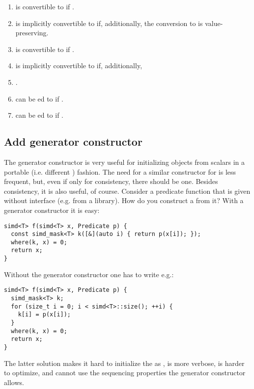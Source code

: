 \begin{enumerate}
  \item {} is convertible to  if
    .

  \item {} is implicitly convertible to 
    if, additionally, the conversion  to  is
    value-preserving.

  \item {} is convertible to  if
    .

  \item {} is implicitly convertible to
     if, additionally, \item {}.

  \item {} can be ed to  if
    .

  \item {} can be ed to  if
    .
\end{enumerate}

\subsection{Add  generator constructor}
The  generator constructor is very useful for initializing objects
from scalars in a portable (i.e. different ) fashion.
The need for a similar constructor for  is less frequent, but,
even if only for consistency, there should be one.
Besides consistency, it is also useful, of course.
Consider a predicate function that is given without  interface (e.g. from a library).
How do you construct a  from it?
With a generator constructor it is easy:
\medskip\begin{lstlisting}[style=Vc]
simd<T> f(simd<T> x, Predicate p) {
  const simd_mask<T> k([&](auto i) { return p(x[i]); });
  where(k, x) = 0;
  return x;
}
\end{lstlisting}
Without the generator constructor one has to write e.g.:
\medskip\begin{lstlisting}[style=Vc]
simd<T> f(simd<T> x, Predicate p) {
  simd_mask<T> k;
  for (size_t i = 0; i < simd<T>::size(); ++i) {
    k[i] = p(x[i]);
  }
  where(k, x) = 0;
  return x;
}
\end{lstlisting}
The latter solution makes it hard to initialize the  as , is more verbose, is harder to optimize, and cannot use the sequencing properties the generator constructor allows.

